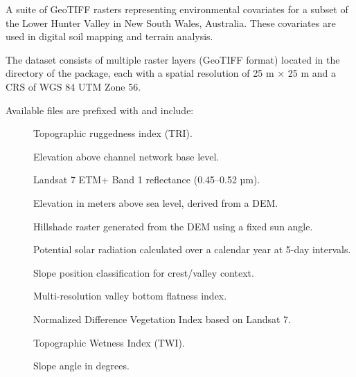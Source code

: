 \documentclass[a4paper]{book}
\begin{document}
%
\begin{Description}
A suite of GeoTIFF rasters representing environmental covariates for a subset of the Lower Hunter Valley in New South Wales, Australia. These covariates are used in digital soil mapping and terrain analysis.
\end{Description}
%
\begin{Format}
The dataset consists of multiple raster layers (GeoTIFF format) located in the  directory of the package, each with a spatial resolution of 25 m × 25 m and a CRS of WGS 84 UTM Zone 56.

Available files are prefixed with  and include:

\begin{description}

\item[] Topographic ruggedness index (TRI).
\item[] Elevation above channel network base level.
\item[] Landsat 7 ETM+ Band 1 reflectance (0.45–0.52 µm).
\item[] Elevation in meters above sea level, derived from a DEM.
\item[] Hillshade raster generated from the DEM using a fixed sun angle.
\item[] Potential solar radiation calculated over a calendar year at 5-day intervals.
\item[] Slope position classification for crest/valley context.
\item[] Multi-resolution valley bottom flatness index.
\item[] Normalized Difference Vegetation Index based on Landsat 7.
\item[] Topographic Wetness Index (TWI).
\item[] Slope angle in degrees.

\end{description}

\end{Format}
\end{document}
